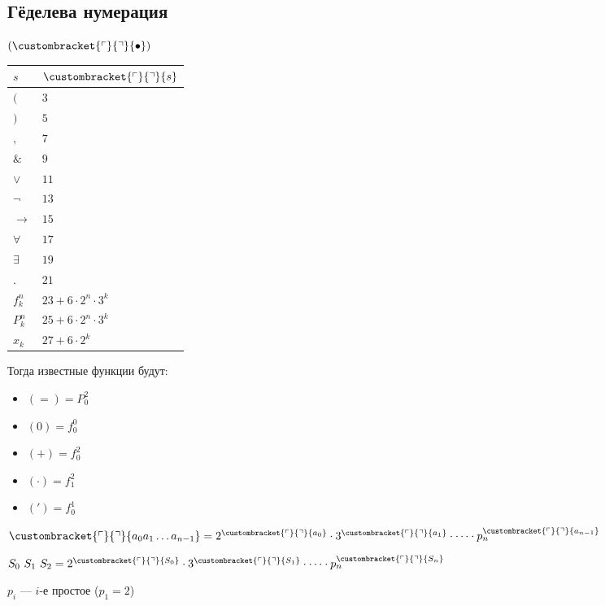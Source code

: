\documentclass[english]{article}
\newcommand{\gedel}[1]{\custombracket{\ulcorner}{\urcorner}{#1}}
\begin{document}
\subsection{Гёделева нумерация}
\label{sec:org8c12004}
\begin{definition}
	\((\gedel{\bullet})\)
	\begin{center}
		\begin{tabular}{l|l}
			\(s\)       & \(\gedel{s}\)                 \\
			\hline
			\((\)       & \(3\)                         \\
			\hline
			\()\)       & \(5\)                         \\
			\hline
			\(,\)       & \(7\)                         \\
			\hline
			\(\&\)      & \(9\)                         \\
			\hline
			\(\vee\)    & \(11\)                        \\
			\hline
			\(\neg\)    & \(13\)                        \\
			\hline
			\(\to\)     & \(15\)                        \\
			\hline
			\(\forall\) & \(17\)                        \\
			\hline
			\(\exists\) & \(19\)                        \\
			\hline
			\(.\)       & \(21\)                        \\
			\hline
			\(f^n_k\)   & \(23 + 6\cdot 2^n \cdot 3^k\) \\
			\hline
			\(P^n_k\)   & \(25 + 6\cdot 2^n\cdot 3^k\)  \\
			\hline
			\(x_k\)     & \(27 + 6\cdot 2^k\)           \\
		\end{tabular}
	\end{center}
	Тогда известные функции будут:
	\begin{itemize}
		\item \((=) = P^2_0\)
		\item \((0) = f^0_0\)
		\item \((+) = f^2_0\)
		\item \((\cdot) = f^2_1\)
		\item \((') = f^1_0\)
	\end{itemize}
	\label{org3e808a7}
\end{definition}
\begin{definition}
	\(\gedel{a_0a_1\dots a_{n - 1}} = 2^{\gedel{a_0}}\cdot 3^{\gedel{a_1}} \cdot \dots \cdot p_n^{\gedel{a_{n - 1}}}\)
	\label{org75cbe5d}
\end{definition}
\begin{definition}
	\(S_0\ S_1\ S_2 = 2^{\gedel{S_0}}\cdot 3^{\gedel{S_1}}\cdot\dots\cdot p_n^{\gedel{S_n}}\)
	\label{org4e978da}
\end{definition}
\begin{remark}
	\(p_i\) --- \(i\)-е простое (\(p_1 = 2\))
	\label{org03737e1}
\end{remark}
\end{document}
